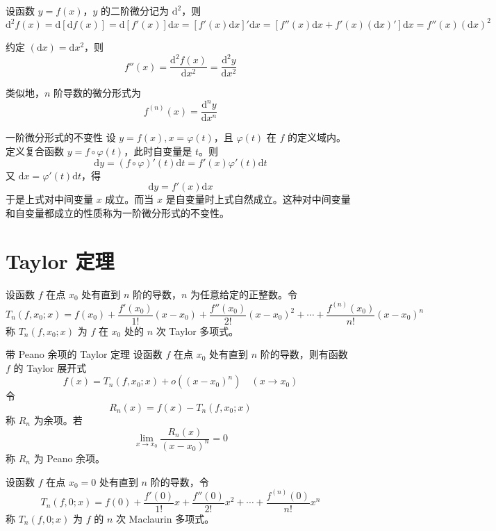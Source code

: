 设函数 $y = f(x)$，$y$ 的二阶微分记为 $\mathrm{d}^2$，则
\[\mathrm{d}^2f(x) = \mathrm{d}[\mathrm{d}f(x)] = \mathrm{d}[f'(x)]\mathrm{d}x = [f'(x)\mathrm{d}x]'\mathrm{d}x = [f''(x)\mathrm{d}x + f'(x)(\mathrm{d}x)']\mathrm{d}x = f''(x)(\mathrm{d}x)^2\]

约定 $(\mathrm{d}x) = \mathrm{d}x^2$，则
\[f''(x) = \frac{\mathrm{d}^{2}f(x)}{\mathrm{d}x^2} = \frac{\mathrm{d}^{2}y}{\mathrm{d}x^2}\]

类似地，$n$ 阶导数的微分形式为
\[f^{(n)}(x) = \frac{\mathrm{d}^{n}y}{\mathrm{d}x^n}\]

\begin{proposition}{一阶微分形式的不变性}
    设 $y = f(x), x = \varphi(t)$，且 $\varphi(t)$ 在 $f$ 的定义域内。定义复合函数 $y = f \circ \varphi(t)$，此时自变量是 $t$。则
    \[\mathrm{d}y = (f\circ\varphi)'(t)\mathrm{d}t = f'(x)\varphi'(t)\mathrm{d}t\]
    又 $\mathrm{d}x = \varphi'(t)\mathrm{d}t$，得
    \[\mathrm{d}y = f'(x)\mathrm{d}x\]
    于是上式对中间变量 $x$ 成立。而当 $x$ 是自变量时上式自然成立。这种对中间变量和自变量都成立的性质称为一阶微分形式的不变性。
\end{proposition}

\section{Taylor 定理}

\begin{definition}
    设函数 $f$ 在点 $x_0$ 处有直到 $n$ 阶的导数，$n$ 为任意给定的正整数。令
    \[T_n(f,x_0;x) = f(x_0) + \frac{f'(x_0)}{1!}(x - x_0) + \frac{f''(x_0)}{2!}(x - x_0)^2 + \cdots + \frac{f^{(n)}(x_0)}{n!}(x - x_0)^n\]
    称 $T_n(f,x_0;x)$ 为 $f$ 在 $x_0$ 处的 $n$ 次 Taylor 多项式。
\end{definition}

\begin{theorem}{带 Peano 余项的 Taylor 定理}
    设函数 $f$ 在点 $x_0$ 处有直到 $n$ 阶的导数，则有函数 $f$ 的 Taylor 展开式
    \[f(x) = T_n(f,x_0;x) + o((x - x_0)^n)\quad (x \to x_0)\]
    令
    \[R_n(x) = f(x) - T_n(f,x_0;x)\]
    称 $R_n$ 为余项。若
    \[\lim_{x \to x_0}\frac{R_n(x)}{(x - x_0)^n} = 0\]
    称 $R_n$ 为 Peano 余项。
\end{theorem}

\begin{definition}
    设函数 $f$ 在点 $x_0 = 0$ 处有直到 $n$ 阶的导数，令
    \[T_n(f,0;x) = f(0) + \frac{f'(0)}{1!}x + \frac{f''(0)}{2!}x^2 + \cdots + \frac{f^{(n)}(0)}{n!}x^n\]
    称 $T_n(f,0;x)$ 为 $f$ 的 $n$ 次 Maclaurin 多项式。
\end{definition}

